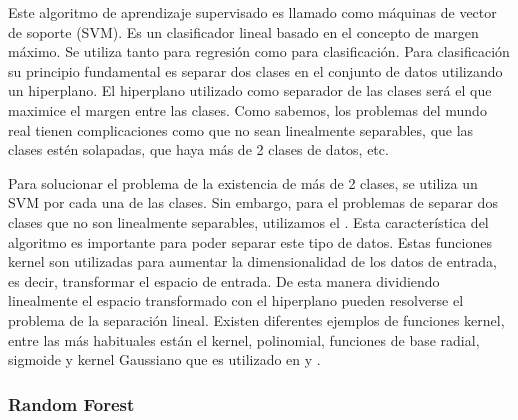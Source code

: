 Este algoritmo de aprendizaje supervisado es llamado como máquinas de vector de soporte (SVM). Es un clasificador lineal basado en el concepto de margen máximo. Se utiliza tanto para regresión como para clasificación. Para clasificación su principio fundamental es separar dos clases en el conjunto de datos utilizando un hiperplano. El hiperplano utilizado como separador de las clases será el que maximice el margen entre las clases. Como sabemos, los problemas del mundo real tienen complicaciones como que no sean linealmente separables, que las clases estén solapadas, que haya más de 2 clases de datos, etc. 

Para solucionar el problema de la existencia de más de 2 clases, se utiliza un SVM por cada una de las clases. Sin embargo, para el problemas de separar dos clases que no son linealmente separables, utilizamos el . Esta característica del algoritmo es importante para poder separar este tipo de datos. Estas funciones kernel son utilizadas para aumentar la dimensionalidad de los datos de entrada, es decir, transformar el espacio de entrada. De esta manera dividiendo linealmente el espacio transformado con el hiperplano pueden resolverse el problema de la separación lineal.  Existen diferentes ejemplos de funciones kernel, entre las más habituales están el kernel, polinomial, funciones de base radial, sigmoide y kernel Gaussiano que es utilizado en \cite{MxLtNovel} y \cite{Orz2016}.

\subsubsection{Random Forest \cite{breiman2001random}}

